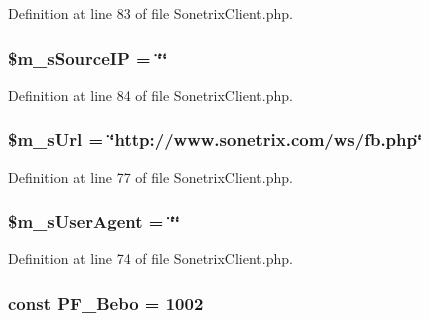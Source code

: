 Definition at line 83 of file SonetrixClient.php.

\hypertarget{classSonetrixClient_a18f4e0dc2a0b958c79a301411d4be3db}{
\subsubsection[{\$m\_\-sSourceIP}]{\setlength{\rightskip}{0pt plus 5cm}\$m\_\-sSourceIP = \char`\"{}\char`\"{}}}
\label{classSonetrixClient_a18f4e0dc2a0b958c79a301411d4be3db}


Definition at line 84 of file SonetrixClient.php.

\hypertarget{classSonetrixClient_ab16efc62694fc7d6620d2f951db167ac}{
\subsubsection[{\$m\_\-sUrl}]{\setlength{\rightskip}{0pt plus 5cm}\$m\_\-sUrl = \char`\"{}http://www.sonetrix.com/ws/fb.php\char`\"{}}}
\label{classSonetrixClient_ab16efc62694fc7d6620d2f951db167ac}


Definition at line 77 of file SonetrixClient.php.

\hypertarget{classSonetrixClient_afd680e0c3a487e8558cd5ad9d1cb0611}{
\subsubsection[{\$m\_\-sUserAgent}]{\setlength{\rightskip}{0pt plus 5cm}\$m\_\-sUserAgent = \char`\"{}\char`\"{}}}
\label{classSonetrixClient_afd680e0c3a487e8558cd5ad9d1cb0611}


Definition at line 74 of file SonetrixClient.php.

\hypertarget{classSonetrixClient_a0f114d21419d464659b0771683bec488}{
\subsubsection[{PF\_\-Bebo}]{\setlength{\rightskip}{0pt plus 5cm}const {\bf PF\_\-Bebo} = 1002}}
\label{classSonetrixClient_a0f114d21419d464659b0771683bec488}


